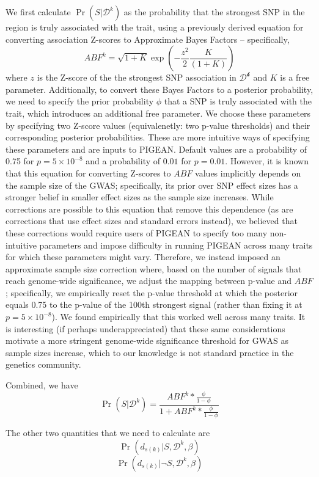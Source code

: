 \documentclass[11pt]{article}
\begin{document}
We first calculate
$\Pr\left(S|\mathcal{D}^k\right)$ as the probability that the
strongest SNP in the region is truly associated with the trait, using
a previously derived equation for converting association Z-scores to Approximate Bayes Factors\cite{} --
specifically,
\[ABF^k = \sqrt{1+K}\exp\left(-\frac{z^2}{2}\frac{K}{\left(1+K\right)}\right)\]
where $z$ is the Z-score of the the strongest SNP association in $\mathcal{D^k}$ and $K$ is a free parameter. Additionally, to convert these Bayes Factors to a
posterior probability, we need to specify the prior probability $\phi$
that a
SNP is truly associated with the trait, which introduces an additional free parameter. We
choose these parameters by specifying two Z-score values
(equivalenetly: two p-value thresholds) and their corresponding
posterior probabilities. These are more intuitive ways of specifying
these parameters and are inputs to PIGEAN. Default values are
a probability of 0.75 for $p=5\times10^{-8}$ and a probability of $0.01$ for
$p=0.01$. However, it is known\cite{} that this equation for
converting Z-scores to $ABF$ values implicitly depends on the sample
size of the GWAS; specifically, its prior over SNP effect
sizes has a stronger belief in smaller effect sizes as the sample size
increases. While corrections are possible to this equation that remove
this dependence (as are
corrections that use effect sizes and standard
errors instead), we believed that these corrections would require users of PIGEAN to specify
too many non-intuitive parameters and impose difficulty in running
PIGEAN across many traits for which these parameters might
vary. Therefore, we instead imposed an approximate sample size
correction where, based on the number of signals that reach
genome-wide significance, we adjust the mapping between p-value and
$ABF$; specifically, we empirically reset the p-value threshold at which the
posterior equals 0.75 to the p-value of the 100th strongest signal
(rather than fixing it at $p=5\times10^{-8}$). We found empirically
that this worked well across many traits. It is interesting (if
perhaps underappreciated) that these same considerations motivate a
more stringent genome-wide significance threshold for GWAS as sample
sizes increase, which to our knowledge is not standard practice in the
genetics community.

Combined, we have
\[
\Pr\left(S|\mathcal{D}^k\right) = \frac{ABF^k * \frac{\phi}{1-\phi}}{1
  + ABF^k * \frac{\phi}{1-\phi}}
\]

The other two quantities that we need to calculate are
\[\Pr\left(d_{s(k)}|S,\mathcal{D}^k,\beta\right)\]
\[\Pr\left(d_{s(k)}|\neg S,\mathcal{D}^k,\beta\right)\]
\end{document}
